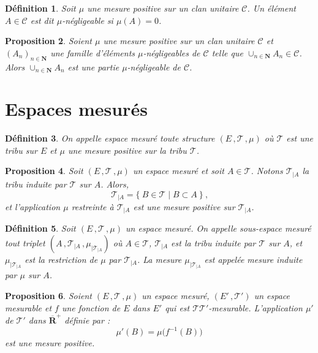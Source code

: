 \documentclass{scrreport}
\theoremstyle{def}
\newtheorem{definition}{Définition}
\theoremstyle{thm}
\theoremstyle{prop}
\newtheorem{proposition}[definition]{Proposition}
\theoremstyle{rem}
\numberwithin{definition}{section}
\numberwithin{lemma}{section}
\numberwithin{proposition}{section}
\numberwithin{theorem}{section}
\numberwithin{corol}{section}
\numberwithin{notation}{section}
\numberwithin{example}{section}
\numberwithin{exercise}{section}
\numberwithin{remark}{section}
\newcommand{\N}{\mathbf{N}}
\newcommand{\R}{\mathbf{R}}
\newcommand{\RR}{\overline{\R}}
\newcommand{\scrC}{\mathscr{C}}
\newcommand{\scrT}{\mathscr{T}}
\newcommand{\p}{\:\!}
\begin{document}
\begin{definition}\label{def2:1:15}
	Soit \(\mu\) une mesure positive sur un clan unitaire \(\scrC\). Un élément \(A \in \scrC\) est dit \(\mu\)-négligeable si \(\mu(A) = 0\).
\end{definition}

\begin{proposition}\label{prop2:1:16}
	Soient \(\mu\) une mesure positive sur un clan unitaire \(\scrC\) et \({(A_n)}_{n \in \N}\) une famille d'éléments \(\mu\)-négligeables de \(\scrC\) telle que \(\cup_{n \in \N} A_n \in \scrC\). Alors \(\cup_{n \in \N} A_n\) est une partie \( \mu\)-négligeable de \(\scrC\).
\end{proposition}

\section{Espaces mesurés}

\begin{definition}\label{def2:2:1}
	On appelle espace mesuré toute structure \((E\,, \scrT\,, \mu)\) où \(\scrT\) est une tribu sur \(E\) et \(\mu\) une mesure positive sur la tribu \(\scrT\).
\end{definition}

\begin{proposition}\label{prop2:2:2}
	Soit \((E\,, \scrT\,, \mu)\) un espace mesuré et soit \(A \in \scrT\). Notons \(\scrT_{|A}\) la tribu induite par \(\scrT\) sur \(A\). Alors,
	\[ \scrT_{|A} = \{\p B \in \scrT \mathrel{|} B \subset A \p\} \: \text{,} \]
	et l'application \(\mu\) restreinte à \(\scrT_{|A}\) est une mesure positive sur \(\scrT_{|A}\).
\end{proposition}

\begin{definition}\label{def2:2:3}
	Soit \((E\,, \scrT\,, \mu)\) un espace mesuré. On appelle sous-espace mesuré tout triplet \((A\,, \scrT_{|A}\,, \mu_{|\scrT_{|A}})\) où \(A \in \scrT\), \(\scrT_{|A}\) est la tribu induite par \(\scrT\) sur \(A\), et \(\mu_{|\scrT_{|A}}\) est la restriction de \(\mu\) par \(\scrT_{|A}\). La mesure \(\mu_{|\scrT_{|A}}\) est appelée mesure induite par \(\mu\) sur \(A\).
\end{definition}

\begin{proposition}\label{prop2:2:4}
	Soient \((E\,, \scrT\,, \mu)\) un espace mesuré, \((E'\,, \scrT')\) un espace mesurable et \(f\) une fonction de \(E\) dans \(E'\) qui est \(\scrT \scrT'\)-mesurable. L'application \(\mu'\) de \(\scrT'\) dans \(\RR^+\) définie par :
	\[ \mu'(B) = \mu\bigl(f^{-1}(B)\bigr) \]
	est une mesure positive.
\end{proposition}
\end{document}
